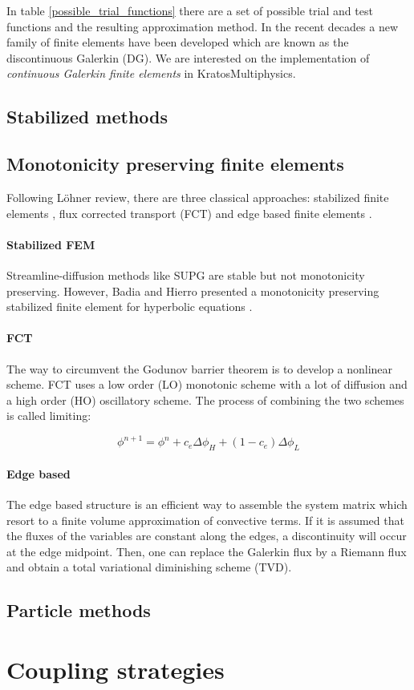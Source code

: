 In table \ref{possible_trial_functions} there are a set of possible trial and test functions and the resulting approximation method. In the recent decades a new family of finite elements have been developed which are known as the discontinuous Galerkin (DG). We are interested on the implementation of \emph{continuous Galerkin finite elements} in KratosMultiphysics.


\subsection{Stabilized methods}



\subsection{Monotonicity preserving finite elements}

Following Löhner review, there are three classical approaches: stabilized finite elements \cite{lohner2008}, flux corrected transport (FCT) \cite{lohner2008ch9} and edge based finite elements \cite{lohner2008ch10}.

\paragraph*{Stabilized FEM} Streamline-diffusion methods like SUPG are stable but not
monotonicity preserving. However, Badia and Hierro presented a monotonicity preserving stabilized finite element for hyperbolic equations \cite{badia2014}.

\paragraph*{FCT} The way to circumvent the Godunov barrier theorem \cite{godunov1959} is to develop a nonlinear scheme. FCT uses a low order (LO) monotonic scheme with a lot of diffusion and a high order (HO) oscillatory scheme. The process of combining the two schemes is called limiting:

\begin{equation}
\phi^{n+1} = \phi^n + c_e\Delta \phi_H + (1-c_e)\Delta \phi_L
\end{equation}

\paragraph*{Edge based} The edge based structure is an efficient way to assemble the system matrix which resort to a
finite volume approximation of convective terms. If it is assumed that the fluxes of the variables are constant along the edges, a discontinuity will occur at the edge midpoint. Then, one can replace the Galerkin flux by a Riemann flux and obtain a total variational diminishing scheme (TVD).


\subsection{Particle methods}



\section{Coupling strategies}

